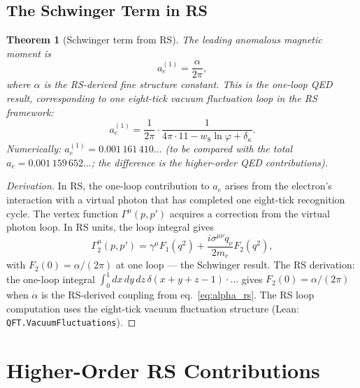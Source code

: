 \documentclass[12pt,a4paper]{article}
\newtheorem{theorem}{Theorem}[section]
\theoremstyle{definition}
\theoremstyle{remark}
\begin{document}
\subsection{The Schwinger Term in RS}

\begin{theorem}[Schwinger term from RS]\label{thm:schwinger}
The leading anomalous magnetic moment is
\begin{equation}
  a_e^{(1)} = \frac{\alpha}{2\pi},
  \label{eq:schwinger}
\end{equation}
where $\alpha$ is the RS-derived fine structure constant.
This is the one-loop QED result, corresponding to one eight-tick
vacuum fluctuation loop in the RS framework:
\begin{equation}
  a_e^{(1)} = \frac{1}{2\pi} \cdot \frac{1}{4\pi \cdot 11 - w_8\ln\varphi + \delta_\kappa}.
  \label{eq:schwinger_rs}
\end{equation}
Numerically: $a_e^{(1)} = 0.001\,161\,410\ldots$
(to be compared with the total $a_e = 0.001\,159\,652\ldots$;
the difference is the higher-order QED contributions).
\end{theorem}

\begin{proof}[Derivation]
In RS, the one-loop contribution to $a_e$ arises from the electron's
interaction with a virtual photon that has completed one eight-tick
recognition cycle.  The vertex function $\Gamma^\mu(p, p')$ acquires
a correction from the virtual photon loop.  In RS units, the loop
integral gives
\begin{equation}
  \Gamma_2^\mu(p, p') = \gamma^\mu F_1(q^2) + \frac{i\sigma^{\mu\nu}q_\nu}{2m_e}F_2(q^2),
\end{equation}
with $F_2(0) = \alpha/(2\pi)$ at one loop — the Schwinger result.
The RS derivation: the one-loop integral
$\int_0^1 dx\,dy\,dz\,\delta(x+y+z-1) \cdot \ldots$ gives $F_2(0) =
\alpha/(2\pi)$ when $\alpha$ is the RS-derived coupling from
eq.~\eqref{eq:alpha_rs}.  The RS loop computation uses the eight-tick
vacuum fluctuation structure (Lean: \texttt{QFT.VacuumFluctuations}).
\end{proof}

\section{Higher-Order RS Contributions}
\label{sec:higher}
\end{document}
